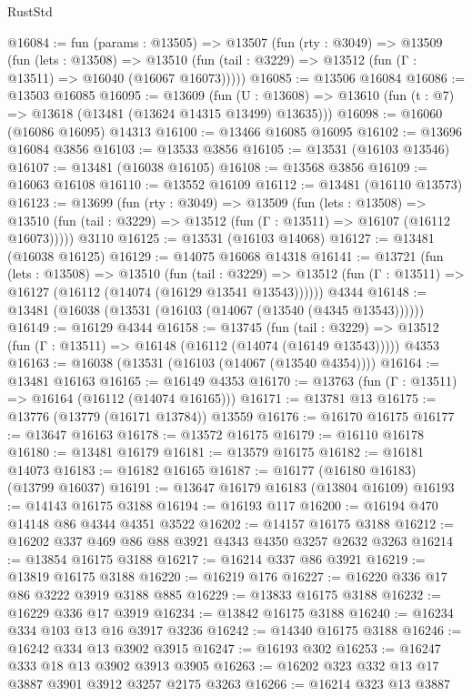\begin{lexlean}{RustStd}
\begin{coremodule}
@16084 := fun (params : @13505) =>
  @13507
    (fun (rty : @3049) =>
    @13509
      (fun (lets : @13508) =>
      @13510 (fun (tail : @3229) => @13512 (fun (Γ : @13511) => @16040 (@16067 @16073)))))
@16085 := @13506 @16084
@16086 := @13503 @16085
@16095 := @13609
    (fun (U : @13608) => @13610 (fun (t : @7) => @13618 (@13481 (@13624 @14315 @13499) @13635)))
@16098 := @16060 (@16086 @16095) @14313
@16100 := @13466 @16085 @16095
@16102 := @13696 @16084 @3856
@16103 := @13533 @3856
@16105 := @13531 (@16103 @13546)
@16107 := @13481 (@16038 @16105)
@16108 := @13568 @3856
@16109 := @16063 @16108
@16110 := @13552 @16109
@16112 := @13481 (@16110 @13573)
@16123 := @13699
    (fun (rty : @3049) =>
    @13509
      (fun (lets : @13508) =>
      @13510 (fun (tail : @3229) => @13512 (fun (Γ : @13511) => @16107 (@16112 @16073)))))
    @3110
@16125 := @13531 (@16103 @14068)
@16127 := @13481 (@16038 @16125)
@16129 := @14075 @16068 @14318
@16141 := @13721
    (fun (lets : @13508) =>
    @13510
      (fun (tail : @3229) =>
      @13512 (fun (Γ : @13511) => @16127 (@16112 (@14074 (@16129 @13541 @13543))))))
    @4344
@16148 := @13481 (@16038 (@13531 (@16103 (@14067 (@13540 (@4345 @13543))))))
@16149 := @16129 @4344
@16158 := @13745
    (fun (tail : @3229) => @13512 (fun (Γ : @13511) => @16148 (@16112 (@14074 (@16149 @13543)))))
    @4353
@16163 := @16038 (@13531 (@16103 (@14067 (@13540 @4354))))
@16164 := @13481 @16163
@16165 := @16149 @4353
@16170 := @13763 (fun (Γ : @13511) => @16164 (@16112 (@14074 @16165)))
@16171 := @13781 @13
@16175 := @13776 (@13779 (@16171 @13784)) @13559
@16176 := @16170 @16175
@16177 := @13647 @16163
@16178 := @13572 @16175
@16179 := @16110 @16178
@16180 := @13481 @16179
@16181 := @13579 @16175
@16182 := @16181 @14073
@16183 := @16182 @16165
@16187 := @16177 (@16180 @16183) (@13799 @16037)
@16191 := @13647 @16179 @16183 (@13804 @16109)
@16193 := @14143 @16175 @3188
@16194 := @16193 @117
@16200 := @16194 @470 @14148 @86 @4344 @4351 @3522
@16202 := @14157 @16175 @3188
@16212 := @16202 @337 @469 @86 @88 @3921 @4343 @4350 @3257 @2632 @3263
@16214 := @13854 @16175 @3188
@16217 := @16214 @337 @86 @3921
@16219 := @13819 @16175 @3188
@16220 := @16219 @176
@16227 := @16220 @336 @17 @86 @3222 @3919 @3188 @885
@16229 := @13833 @16175 @3188
@16232 := @16229 @336 @17 @3919
@16234 := @13842 @16175 @3188
@16240 := @16234 @334 @103 @13 @16 @3917 @3236
@16242 := @14340 @16175 @3188
@16246 := @16242 @334 @13 @3902 @3915
@16247 := @16193 @302
@16253 := @16247 @333 @18 @13 @3902 @3913 @3905
@16263 := @16202 @323 @332 @13 @17 @3887 @3901 @3912 @3257 @2175 @3263
@16266 := @16214 @323 @13 @3887

\end{coremodule}
\end{lexlean}
